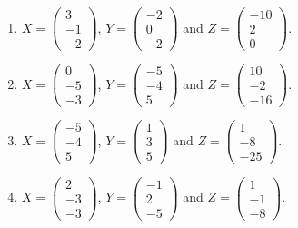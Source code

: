 \begin{enumerate}[label=\arabic*.,  leftmargin=*]
\item $X = \begin{pmatrix} 3 \\ -1 \\ -2 \end{pmatrix}$, $Y = \begin{pmatrix} -2 \\ 0 \\ -2 \end{pmatrix}$ and $Z = \begin{pmatrix} -10 \\ 2 \\ 0 \end{pmatrix}$.
\item $X = \begin{pmatrix} 0 \\ -5 \\ -3 \end{pmatrix}$, $Y = \begin{pmatrix} -5 \\ -4 \\ 5 \end{pmatrix}$ and $Z = \begin{pmatrix} 10 \\ -2 \\ -16 \end{pmatrix}$.
\item $X = \begin{pmatrix} -5 \\ -4 \\ 5 \end{pmatrix}$, $Y = \begin{pmatrix} 1 \\ 3 \\ 5 \end{pmatrix}$ and $Z = \begin{pmatrix} 1 \\ -8 \\ -25 \end{pmatrix}$.
\item $X = \begin{pmatrix} 2 \\ -3 \\ -3 \end{pmatrix}$, $Y = \begin{pmatrix} -1 \\ 2 \\ -5 \end{pmatrix}$ and $Z = \begin{pmatrix} 1 \\ -1 \\ -8 \end{pmatrix}$.

\end{enumerate}
